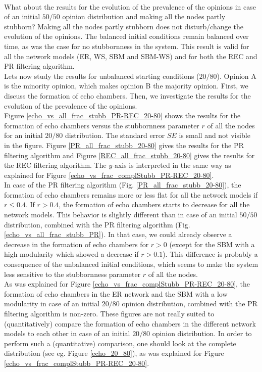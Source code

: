 \documentclass[11 pt , letterpaper , twoside , openright]{book}
\begin{document}
\\
\newline
What about the results for the evolution of the prevalence of the opinions in case of an initial $50/50$ opinion distribution and making all the nodes partly stubborn? Making all the nodes partly stubborn does not disturb/change the evolution of the opinions. The balanced initial conditions remain balanced over time, as was the case for no stubbornness in the system. This result is valid for all the network models (ER, WS, SBM and SBM-WS) and for both the REC and PR filtering algorithm.\\
\newline
Lets now study the results for unbalanced starting conditions ($20/80$). Opinion A is the minority opinion, which makes opinion B the majority opinion. First, we discuss the formation of echo chambers. Then, we investigate the results for the evolution of the prevalence of the opinions.\\
\newline
Figure \ref{echo_vs_all_frac_stubb_PR-REC_20-80} shows the results for the formation of echo chambers versus the stubbornness parameter $r$ of all the nodes for an initial $20/80$ distribution. The standard error $SE$ is small and not visible in the figure. Figure \ref{PR_all_frac_stubb_20-80} gives the results for the PR filtering algorithm and Figure \ref{REC_all_frac_stubb_20-80} gives the results for the REC filtering algorithm. The $y$-axis is interpreted in the same way as explained for Figure \ref{echo_vs_frac_complStubb_PR-REC_20-80}.\\
\newline
In case of the PR filtering algorithm (Fig. \ref{PR_all_frac_stubb_20-80}), the formation of echo chambers remains more or less flat for all the network models if $r \leqslant 0.4$. If $r > 0.4$, the formation of echo chambers starts to decrease for all the network models. This behavior is slightly different than in case of an initial $50/50$ distribution, combined with the PR filtering algorithm (Fig. \ref{echo_vs_all_frac_stubb_PR}). In that case, we could already observe a decrease in the formation of echo chambers for $r > 0$ (except for the SBM with a high modularity which showed a decrease if $r>0.1$). This difference is probably a consequence of the unbalanced initial conditions, which seems to make the system less sensitive to the stubbornness parameter $r$ of all the nodes.\\
\newline
As was explained for Figure \ref{echo_vs_frac_complStubb_PR-REC_20-80}, the formation of echo chambers in the ER network and the SBM with a low modularity in case of an initial $20/80$ opinion distribution, combined with the PR filtering algorithm is non-zero. These figures are not really suited to (quantitatively) compare the formation of echo chambers in the different network models to each other in case of an initial $20/80$ opinion distribution. In order to perform such a (quantitative) comparison, one should look at the complete distribution (see eg. Figure \ref{echo_20_80}), as was explained for Figure \ref{echo_vs_frac_complStubb_PR-REC_20-80}.
\end{document}
